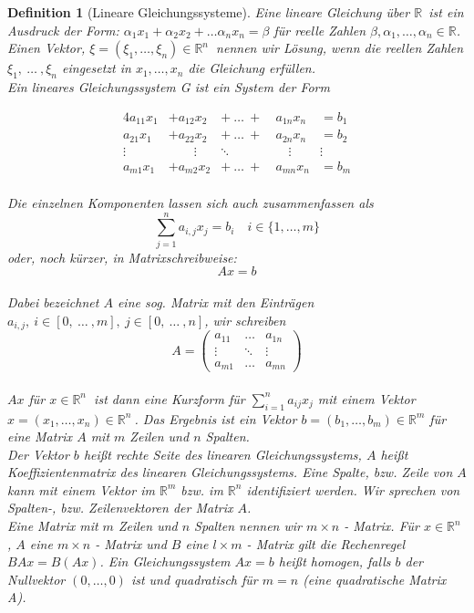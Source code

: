 \documentclass{report}
\newcommand{\R}{\mathbb{R}}
\newcommand{\mR}{$\mathbb{R}$\ }
\newcommand{\Rn}{\mathbb{R}^n\ }
\theoremstyle{customrem}
\theoremstyle{customdef}
\newtheorem*{definition*}{Definition} %
\begin{document}
	\begin{definition*}[Lineare Gleichungssysteme]
		Eine lineare Gleichung über \mR ist ein Ausdruck der Form: $\alpha_1x_1 + \alpha_2 x_2 + \dots \alpha_n x_n = \beta$ für reelle Zahlen $\beta, \alpha_1, \dots, \alpha_n \in \R$. Einen Vektor, $\xi = \left(\xi_1, \dots, \xi_n\right) \in \Rn$ nennen wir Lösung, wenn die reellen Zahlen  $\xi_1, \ \dots\ , \xi_n$ eingesetzt in $x_1, \dots, x_n$ die Gleichung erfüllen.\\
		Ein lineares Gleichungssystem G ist ein System der Form
		
		\begin{alignat*}{4}
			a_{11} x_1 &+ a_{12}x_2 &+\ \dots\ +\ & a_{1n} x_n &= b_1\\
			a_{21} x_1 &+ a_{22}x_2 &+\ \dots\ +\ & a_{2n} x_n &= b_2\\
			\vdots\quad & \qquad\vdots&\ddots\quad \ \ &\quad\vdots & \vdots\  \\
			a_{m1} x_1 &+ a_{m2} x_2  &+\ \dots\ +\ & a_{mn} x_n &= b_m\\
		\end{alignat*}
		
		Die einzelnen Komponenten lassen sich auch zusammenfassen als $$\sum_{j=1}^n a_{i,j} x_j = b_i \quad i\in\{1,\dots,m\}$$
		oder, noch kürzer, in Matrixschreibweise:
			$$Ax=b$$\\
		Dabei bezeichnet $A$ eine sog. Matrix mit den Einträgen $a_{i,j},\ i\in[0,\ \dots\ , m],\ j\in[0,\ \dots\ , n]$, wir schreiben\\
		$$A =
		\begin{pmatrix}
			a_{11} & \dots  & a_{1n}\\
			\vdots & \ddots & \vdots\\
			a_{m1} & \dots  & a_{mn}
		\end{pmatrix}
		$$\\
		$Ax$ für $x \in \Rn$ ist dann eine Kurzform für $\sum_{i=1}^na_{ij}x_j$ mit einem Vektor $x = (x_1, \dots, x_n) \in \Rn$. Das Ergebnis ist ein Vektor $b = (b_1, \dots, b_m) \in \R^m$ für eine Matrix $A$ mit $m$ Zeilen und $n$ Spalten.\\
		Der Vektor $b$ heißt rechte Seite des linearen Gleichungssystems, $A$ heißt Koeffizientenmatrix des linearen Gleichungssystems. Eine Spalte, bzw. Zeile von $A$ kann mit einem Vektor im $\R^m$ bzw. im $\R^n$ identifiziert werden. Wir sprechen von Spalten-, bzw. Zeilenvektoren der Matrix $A$.\\
		Eine Matrix mit $m$ Zeilen und $n$ Spalten nennen wir $m\times n$ - Matrix. Für $x  \in \Rn $, $A$ eine $m\times n$ - Matrix und $B$ eine $l\times m$ - Matrix gilt die Rechenregel $BAx = B(Ax)$. Ein Gleichungssystem $Ax=b$ heißt homogen, falls $b$ der Nullvektor $(0, \dots, 0)$ ist und quadratisch für  $m = n$ (eine quadratische Matrix A).\\
	\end{definition*}
\end{document}
